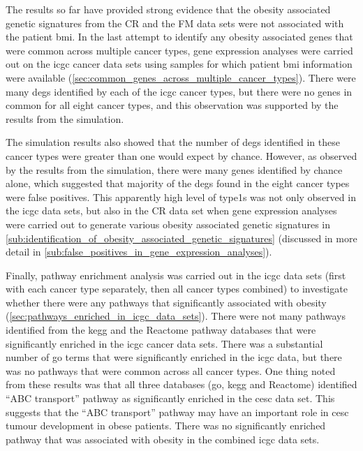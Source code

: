 The results so far have provided strong evidence that the obesity associated genetic signatures from the CR and the FM data sets were not associated with the patient \gls{bmi}.
In the last attempt to identify any obesity associated genes that were common across multiple cancer types, gene expression analyses were carried out on the \gls{icgc} cancer data sets using samples for which patient \gls{bmi} information were available (\cref{sec:common_genes_across_multiple_cancer_types}).
There were many \glspl{deg} identified by each of the \gls{icgc} cancer types, but there were no genes in common for all eight cancer types, and this observation was supported by the results from the simulation.

The simulation results also showed that the number of \glspl{deg} identified in these cancer types were greater than one would expect by chance.
However, as observed by the results from the simulation, there were many genes identified by chance alone, which suggested that majority of the \glspl{deg} found in the eight cancer types were false positives.
This apparently high level of \Glspl{type1} was not only observed in the \gls{icgc} data sets, but also in the CR data set when gene expression analyses were carried out to generate various obesity associated genetic signatures in \cref{sub:identification_of_obesity_associated_genetic_signatures} (discussed in more detail in \cref{sub:false_positives_in_gene_expression_analyses}).

Finally, pathway enrichment analysis was carried out in the \gls{icgc} data sets (first with each cancer type separately, then all cancer types combined) to investigate whether there were any pathways that significantly associated with obesity (\cref{sec:pathways_enriched_in_icgc_data_sets}).
There were not many pathways identified from the \gls{kegg} and the Reactome pathway databases that were significantly enriched in the \gls{icgc} cancer data sets.
There was a substantial number of \gls{go} terms that were significantly enriched in the \gls{icgc} data, but there was no pathways that were common across all cancer types.
One thing noted from these results was that all three databases (\gls{go}, \gls{kegg} and Reactome) identified ``ABC transport'' pathway as significantly enriched in the \gls{cesc} data set.
This suggests that the ``ABC transport'' pathway may have an important role in \gls{cesc} tumour development in obese patients.
There was no significantly enriched pathway that was associated with obesity in the combined \gls{icgc} data sets.

